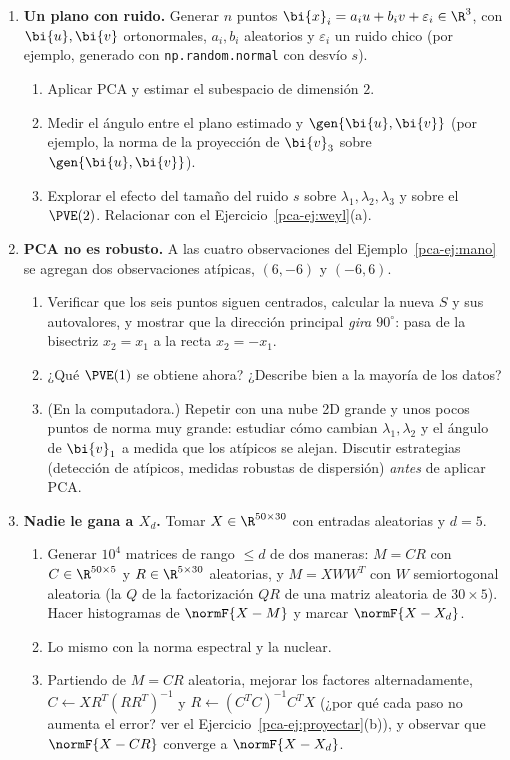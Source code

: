 \begin{enumerate}[leftmargin=*,label=\textbf{\thechapter.\arabic*},ref=\thechapter.\arabic*,itemsep=4pt]
\item {} \textbf{Un plano con ruido.} Generar
$n$ puntos $\bi{x}_i=a_iu+b_iv+\varepsilon_i\in\R^3$, con $\bi{u},\bi{v}$ ortonormales,
$a_i,b_i$ aleatorios y $\varepsilon_i$ un ruido chico (por ejemplo,
generado con \texttt{np.random.normal} con desvío $s$).
\begin{enumerate}[label=(\alph*)]
\item Aplicar PCA y estimar el subespacio de dimensión $2$.
\item Medir el ángulo entre el plano estimado y $\gen\{\bi{u},\bi{v}\}$
(por ejemplo, la norma de la proyección de $\bi{v}_3$ sobre $\gen\{\bi{u},\bi{v}\}$).
\item Explorar el efecto del tamaño del ruido $s$ sobre
$\lambda_1,\lambda_2,\lambda_3$ y sobre el $\PVE(2)$. Relacionar con el
Ejercicio~\ref{pca-ej:weyl}(a).
\end{enumerate}

\item {} \textbf{PCA no es robusto.} A las cuatro observaciones del
Ejemplo~\ref{pca-ej:mano} se agregan dos observaciones atípicas, $(6,-6)$ y
$(-6,6)$.
\begin{enumerate}[label=(\alph*)]
\item Verificar que los seis puntos siguen centrados, calcular la nueva $S$ y
sus autovalores, y mostrar que la dirección principal \emph{gira
$90^\circ$}: pasa de la bisectriz $x_2=x_1$ a la recta $x_2=-x_1$.
\item ¿Qué $\PVE(1)$ se obtiene ahora? ¿Describe bien a la mayoría de los datos?
\item (En la computadora.) Repetir con una nube 2D grande y unos pocos
puntos de norma muy grande: estudiar cómo cambian $\lambda_1,\lambda_2$ y el
ángulo de $\bi{v}_1$ a medida que los atípicos se alejan. Discutir estrategias
(detección de atípicos, medidas robustas de dispersión) \emph{antes} de
aplicar PCA.
\end{enumerate}

\item {} \textbf{Nadie le gana a $X_d$.} Tomar $X\in\R^{50\times30}$
con entradas aleatorias y $d=5$.
\begin{enumerate}[label=(\alph*)]
\item Generar $10^4$ matrices de rango $\le d$ de dos maneras: $M=CR$ con
$C\in\R^{50\times5}$ y $R\in\R^{5\times30}$ aleatorias, y $M=XWW^T$ con
$W$ semiortogonal aleatoria (la $Q$ de la factorización $QR$ de una matriz
aleatoria de $30\times5$). Hacer histogramas de $\normF{X-M}$ y marcar
$\normF{X-X_d}$.
\item Lo mismo con la norma espectral y la nuclear.
\item Partiendo de $M=CR$ aleatoria, mejorar los factores alternadamente,
$C\leftarrow XR^T(RR^T)^{-1}$ y $R\leftarrow(C^T C)^{-1}C^T X$
(¿por qué cada paso no aumenta el error? ver el
Ejercicio~\ref{pca-ej:proyectar}(b)), y observar
que $\normF{X-CR}$ converge a $\normF{X-X_d}$.
\end{enumerate}

\end{enumerate}

